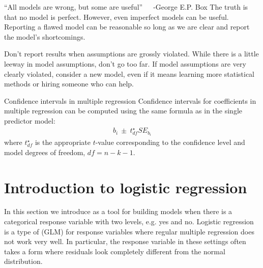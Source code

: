 \begin{onebox}{``All models are wrong, but some are useful''~~~-George E.P. Box}
The truth is that no model is perfect. However, even imperfect models can be useful. Reporting a flawed model can be reasonable so long as we are clear and report the model's shortcomings.
\end{onebox}

Don't report results when assumptions are grossly violated.
While there is a little leeway in model assumptions, don't go too far. If model assumptions are very clearly violated, consider a new model, even if it means learning more statistical methods or hiring someone who can help.

\begin{onebox}{Confidence intervals in multiple regression}
%
Confidence intervals for coefficients in multiple regression can be computed using the same formula as in the single predictor model:
\begin{align*}
b_i \ \pm\ t_{df}^{\star}SE_{b_{i}}
\end{align*}
where $t_{df}^{\star}$ is the appropriate $t$-value corresponding to the confidence level and model degrees of freedom, $df=n-k-1$.
\end{onebox}


\section{Introduction to logistic regression}
\label{logisticRegression}



In this section we introduce 
as a tool for building models when there is a categorical
response variable with two levels, e.g. yes and no.
Logistic regression is a type of
 (GLM) for response variables
where regular multiple regression does not work very well.
In particular, the response variable in these settings often
takes a form where residuals look completely different from
the normal distribution.

